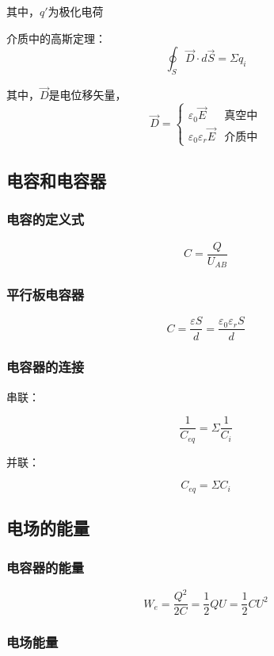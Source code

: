 \documentclass{ctexart}
\begin{document}
其中，$q'$为极化电荷

介质中的高斯定理：
$$\oint_{S}\vec{D}\cdot d\vec{S}=\Sigma q_i$$

其中，$\vec{D}$是电位移矢量，
\begin{equation*}
	\vec{D}=\begin{cases}
		\varepsilon_0 \vec{E}& \text{真空中}\\
		\varepsilon_0 \varepsilon_r \vec{E}& \text{介质中}
	\end{cases}
\end{equation*}

\subsection{电容和电容器}

\subsubsection{电容的定义式}

$$C=\frac{Q}{U_{AB}}$$

\subsubsection{平行板电容器}

$$C=\frac{\varepsilon S}{d}=\frac{\varepsilon_0 \varepsilon_r S}{d}$$

\subsubsection{电容器的连接}

串联：

$$\frac{1}{C_{eq}}=\Sigma \frac{1}{C_i}$$

并联：

$$C_{eq}=\Sigma C_i$$

\subsection{电场的能量}

\subsubsection{电容器的能量}

$$W_e=\frac{Q^2}{2C}=\frac{1}{2}QU=\frac{1}{2}CU^2$$

\subsubsection{电场能量}
\end{document}
